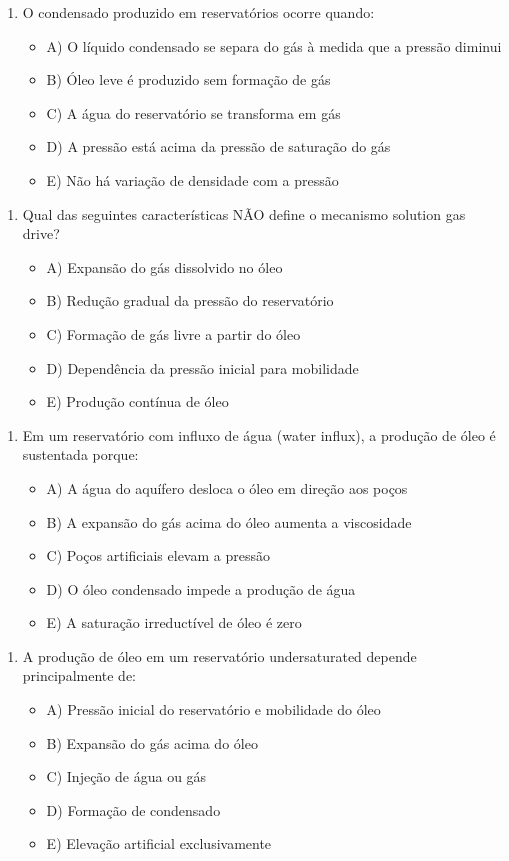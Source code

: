 \documentclass[11pt,a4paper]{article}
\begin{document}
\begin{enumerate}
\item O condensado produzido em reservatórios ocorre quando:
\begin{itemize}
\item A) O líquido condensado se separa do gás à medida que a pressão diminui
\item B) Óleo leve é produzido sem formação de gás
\item C) A água do reservatório se transforma em gás
\item D) A pressão está acima da pressão de saturação do gás
\item E) Não há variação de densidade com a pressão
\end{itemize}
\end{enumerate}

\begin{enumerate}
\item Qual das seguintes características NÃO define o mecanismo solution gas drive?
\begin{itemize}
\item A) Expansão do gás dissolvido no óleo
\item B) Redução gradual da pressão do reservatório
\item C) Formação de gás livre a partir do óleo
\item D) Dependência da pressão inicial para mobilidade
\item E) Produção contínua de óleo
\end{itemize}
\end{enumerate}

\begin{enumerate}
\item Em um reservatório com influxo de água (water influx), a produção de óleo é sustentada porque:
\begin{itemize}
\item A) A água do aquífero desloca o óleo em direção aos poços
\item B) A expansão do gás acima do óleo aumenta a viscosidade
\item C) Poços artificiais elevam a pressão
\item D) O óleo condensado impede a produção de água
\item E) A saturação irreductível de óleo é zero
\end{itemize}
\end{enumerate}

\begin{enumerate}
\item A produção de óleo em um reservatório undersaturated depende principalmente de:
\begin{itemize}
\item A) Pressão inicial do reservatório e mobilidade do óleo
\item B) Expansão do gás acima do óleo
\item C) Injeção de água ou gás
\item D) Formação de condensado
\item E) Elevação artificial exclusivamente
\end{itemize}
\end{enumerate}
\end{document}
